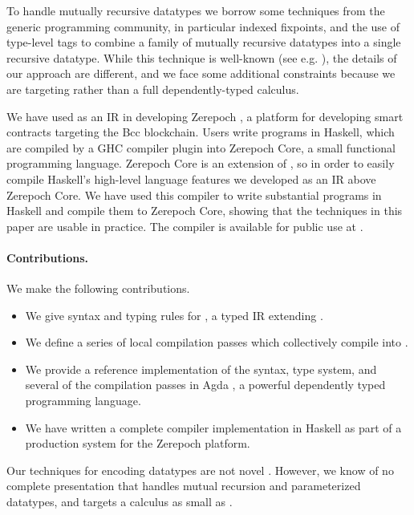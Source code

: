 To handle mutually recursive datatypes we borrow
some techniques from the generic programming community, in particular indexed
fixpoints, and the use of type-level tags to combine a family of mutually
recursive datatypes into a single recursive datatype. While this technique is
well-known (see e.g. \cite{fixmutualgeneric}), the details of our approach
are different, and we face some additional constraints because we are targeting \FOMF{}
rather than a full dependently-typed calculus.

We have used \FIR{} as an IR in developing Zerepoch \cite{zerepochgithub}, a
platform for developing smart contracts targeting the Bcc blockchain. Users
write programs in Haskell, which are compiled by a GHC compiler plugin into
Zerepoch Core, a small functional programming language. Zerepoch Core is an extension
of \FOMF{}, so in order to easily compile Haskell's high-level language features we
developed \FIR{} as an IR above Zerepoch Core. We have used this compiler to write
substantial programs in Haskell and compile them to Zerepoch Core, showing that
the techniques in this paper are usable in practice. The compiler is available
for public use at \cite{zerepochplayground}.

\paragraph{Contributions.}

We make the following contributions.

\begin{itemize}
  \item We give syntax and typing rules for \FIR{}, a typed IR
    extending \FOMF{}.
  \item We define a series of local compilation passes which
    collectively compile \FIR{} into \FOMF{}.
  \item We provide a reference implementation of the syntax, type system, and
    several of the compilation passes in Agda \cite{norell2007towards}, a powerful dependently
    typed programming language.
  \item We have written a complete compiler implementation in Haskell as part of
    a production system for the Zerepoch platform.
\end{itemize}

Our techniques for encoding datatypes are not novel
\cite{fixmutualgeneric}\cite{loh2011generic}. However, we
know of no complete presentation that handles mutual recursion and
parameterized datatypes, and targets a calculus as small as \FOMF{}.

